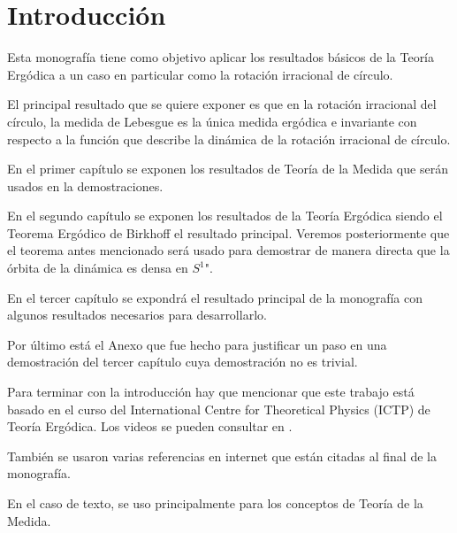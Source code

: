 \chapter{Introducción}

Esta monografía tiene como objetivo aplicar los resultados básicos de la Teoría Ergódica a un caso en particular como la rotación irracional de círculo.

El principal resultado que se quiere exponer es que en la rotación irracional del círculo, la medida de Lebesgue es la única medida ergódica e invariante con respecto a la función que describe la dinámica de la rotación irracional de círculo.

En el primer capítulo se exponen los resultados de Teoría de la Medida que serán usados en la demostraciones.

En el segundo capítulo se exponen los resultados de la Teoría Ergódica siendo el Teorema Ergódico de Birkhoff el resultado principal. Veremos posteriormente que el teorema antes mencionado será usado para demostrar de manera directa que la órbita de la dinámica es densa en $S^1$".

En el tercer capítulo se expondrá el resultado principal de la monografía con algunos resultados necesarios para desarrollarlo.

Por último está el Anexo que fue hecho para justificar un paso en una demostración del tercer capítulo cuya demostración no es trivial.

Para terminar con la introducción hay que mencionar que este trabajo está basado en el curso del International Centre for Theoretical Physics (ICTP) de Teoría Ergódica. Los videos se pueden consultar en \cite{youtube}.

También se usaron varias referencias en internet que están citadas al final de la monografía.

En el caso de texto, se uso principalmente \cite{bartle} para los conceptos de Teoría de la Medida.